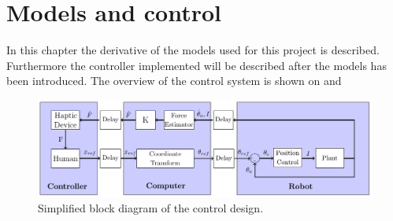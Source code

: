 \chapter{Models and control}
In this chapter the derivative of the models used for this project is described. Furthermore the controller implemented will be described after the models has been introduced. The overview of the control system is shown on  and   



\begin{figure}[H]
	\includegraphics[width=\textwidth]{rapport/pictures/control.pdf} 
	\caption{Simplified block diagram of the control design.}
	\label{fig:simple_control}
\end{figure}




